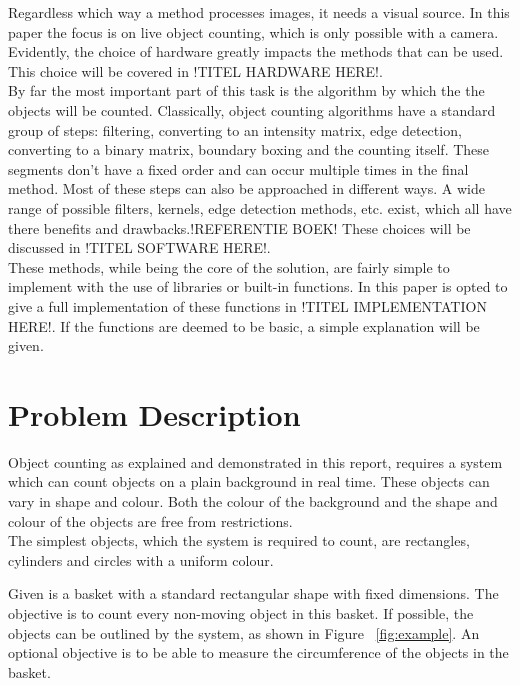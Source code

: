 \documentclass[11pt]{article}
\begin{document}
Regardless which way a method processes images, it needs a visual source. In this paper the focus is on live object counting, which is only possible with a camera. Evidently, the choice of hardware greatly impacts the methods that can be used. This choice will be covered in !TITEL HARDWARE HERE!.\\ 
By far the most important part of this task is the algorithm by which the the objects will be counted. Classically, object counting algorithms have a standard group of steps: filtering, converting to an intensity matrix, edge detection, converting to a binary matrix, boundary boxing and the counting itself. These segments don't have a fixed order and can occur multiple times in the final method. Most of these steps can also be approached in different ways. A wide range of possible filters, kernels, edge detection methods, etc. exist, which all have there benefits and drawbacks.!REFERENTIE BOEK! These choices will be discussed in !TITEL SOFTWARE HERE!.\\
These methods, while being the core of the solution, are fairly simple to implement with the use of libraries or built-in functions. In this paper is opted to give a full implementation of these functions in !TITEL IMPLEMENTATION HERE!. If the functions are deemed to be basic, a simple explanation will be given.


\section{Problem Description}

\hspace{\parindent} Object counting as explained and demonstrated in this report, requires a system which can count objects on a plain background in real time. These objects can vary in shape and colour. Both the colour of the background and the shape and colour of the objects are free from restrictions.\\
The simplest objects, which the system is required to count, are rectangles, cylinders and circles with a uniform colour.

\noindent Given is a basket with a standard rectangular shape with fixed dimensions. The objective is to count every non-moving object in this basket. If possible, the objects can be outlined by the system, as shown in Figure ~\ref{fig:example}. An optional objective is to be able to measure the circumference of the objects in the basket.\\
\end{document}
